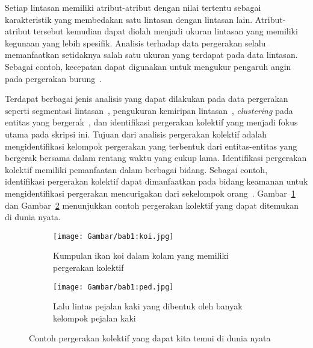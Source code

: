 Setiap lintasan memiliki atribut-atribut dengan nilai tertentu sebagai karakteristik yang membedakan satu lintasan dengan lintasan lain. Atribut-atribut tersebut kemudian dapat diolah menjadi ukuran lintasan yang memiliki kegunaan yang lebih spesifik. Analisis terhadap data pergerakan selalu memanfaatkan setidaknya salah satu ukuran yang terdapat pada data lintasan. Sebagai contoh, kecepatan dapat digunakan untuk mengukur pengaruh angin pada pergerakan burung~\cite{safi:speed}.

\iffalse \lionov{jadiin paragraf baru, kan ini beda topik} \fi

Terdapat berbagai jenis analisis yang dapat dilakukan pada data pergerakan seperti segmentasi lintasan~\cite{mann:01:segmentation}, pengukuran kemiripan lintasan~\cite{rote:01:hausdorff, alt:01:frechet, muller:dtw}, \textit{clustering} pada entitas yang bergerak~\cite{lee:01:clustering}, dan identifikasi pergerakan kolektif yang menjadi fokus utama pada skripsi ini. Tujuan dari analisis pergerakan kolektif adalah mengidentifikasi kelompok pergerakan yang terbentuk dari entitas-entitas yang bergerak bersama dalam rentang waktu yang cukup lama. Identifikasi pergerakan kolektif memiliki pemanfaatan dalam berbagai bidang. Sebagai contoh, identifikasi pergerakan kolektif dapat dimanfaatkan pada bidang keamanan untuk mengidentifikasi pergerakan mencurigakan dari sekelompok orang~\cite{makris:01:security}. Gambar~\ref{bab1:koi} dan Gambar~\ref{bab1:ped} menunjukkan contoh pergerakan kolektif yang dapat ditemukan di dunia nyata.

\begin{figure}[h]
    \centering
    \begin{subfigure}[h]{0.45\textwidth}
        \centering
        \texttt{[image: Gambar/bab1:koi.jpg]}
        \caption{Kumpulan ikan koi dalam kolam yang memiliki pergerakan kolektif\protect\footnotemark[6]}
        \label{bab1:koi}
    \end{subfigure} \hspace{0.25cm}
    \begin{subfigure}[h]{0.45\textwidth}
        \centering
        \texttt{[image: Gambar/bab1:ped.jpg]}
        \caption{Lalu lintas pejalan kaki yang dibentuk oleh banyak kelompok pejalan kaki\protect\footnotemark[7]}
        \label{bab1:ped}
    \end{subfigure}
    \caption[Pergerakan kolektif dunia nyata]{Contoh pergerakan kolektif yang dapat kita temui di dunia nyata}
    \label{bab1:collective-movement}
\end{figure}

